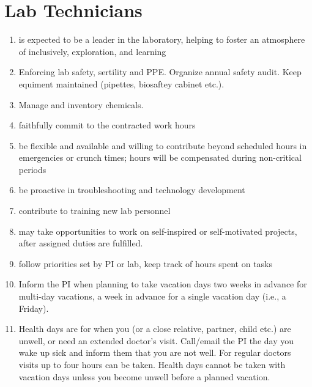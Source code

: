 \documentclass[12pt]{article}
\begin{document}
\section{Lab Technicians}
\begin{enumerate}
\item is expected to be a leader in the laboratory, helping to foster
  an atmosphere of inclusively, exploration, and learning
\item Enforcing lab safety, sertility and PPE. Organize annual safety audit. 
\Item Keep equiment maintained (pipettes, biosaftey cabinet etc.). 
\item Manage and inventory chemicals. 
\item faithfully commit to the contracted work hours
\item be flexible and available and willing to contribute beyond
  scheduled hours in emergencies or crunch times; hours will be
  compensated during non-critical periods
\item be proactive in troubleshooting and technology development
\item contribute to training new lab personnel
\item may take opportunities to work on self-inspired or self-motivated
  projects, after assigned duties are fulfilled.
\item follow priorities set by PI or lab, keep track of hours spent on
  tasks
\item Inform the PI when planning to take vacation days two weeks in
  advance for multi-day vacations, a week in advance for a single
  vacation day (i.e., a Friday).
\item Health days are for when you (or a close relative, partner,
  child etc.) are unwell, or need an extended doctor's
  visit. Call/email the PI the day you wake up sick and inform them
  that you are not well. For regular doctors visits up to four hours
  can be taken. Health days cannot be taken with vacation days unless
  you become unwell before a planned vacation.
\end{enumerate}
\end{document}
